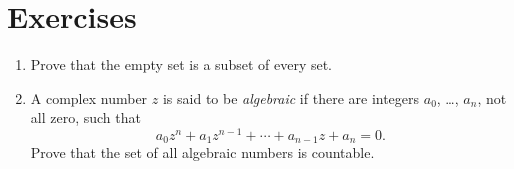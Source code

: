 \section{Exercises}

\begin{enumerate}
    \item Prove that the empty set is a subset of every set.
    \item\label{exercise:2.2} A complex number \(z\) is said to be \emph{algebraic} if there are integers \(a_0\), \ldots, \(a_n\), not all zero, such that
    \begin{equation*}
        a_0z^n+a_1z^{n-1}+\cdots+a_{n-1}z+a_n=0.
    \end{equation*}
    Prove that the set of all algebraic numbers is countable. 
\end{enumerate}
